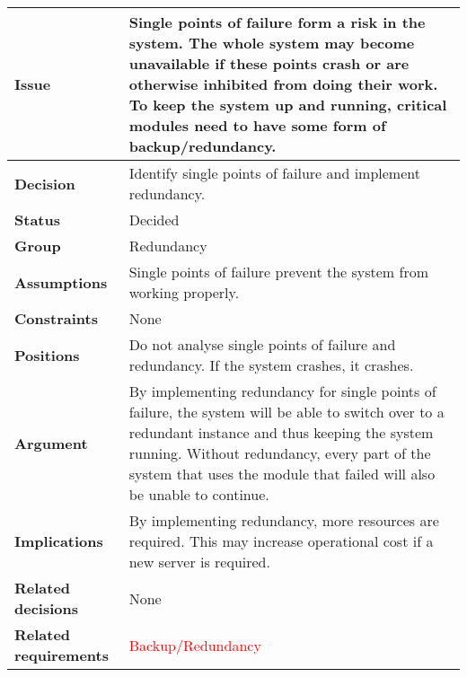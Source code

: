 
\begin{tabular}{ l  p{10cm}}
\hline
\bf Issue & Single points of failure form a risk in the system. The whole system may become unavailable if these points crash or are otherwise inhibited from doing their work. To keep the system up and running, critical modules need to have some form of backup/redundancy. \\
\hline
\bf Decision & Identify single points of failure and implement redundancy. \\
\hline
\bf Status & Decided \\
\hline
\bf Group & Redundancy \\
\hline
\bf Assumptions & Single points of failure prevent the system from working properly. \\
\hline
\bf Constraints & None\\
\hline
\bf Positions & Do not analyse single points of failure and redundancy. If the system crashes, it crashes. \\
\hline
\bf Argument & By implementing redundancy for single points of failure, the system will be able to switch over to a redundant instance and thus keeping the system running. Without redundancy, every part of the system that uses the module that failed will also be unable to continue. \\
\hline
\bf Implications & By implementing redundancy, more resources are required. This may increase operational cost if a new server is required. \\
\hline
\bf Related decisions & None \\
\hline
\bf Related requirements & \textcolor{red}{Backup/Redundancy} \\
\hline
\end{tabular}

